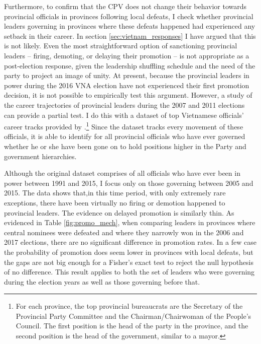 \documentclass[12pt]{article}
\newcommand{\1}{\mathbbm{1}}
\begin{document}
Furthermore, to confirm that the CPV does not change their behavior towards provincial officials in provinces following local defeats, I check whether provincial leaders governing in provinces where these defeats happened had experienced any setback in their career. In section \ref{sec:vietnam_responses} I have argued that this is not likely. Even the most straightforward option of sanctioning provincial leaders -- firing, demoting, or delaying their promotion -- is not appropriate as a post-election response, given the leadership shuffling schedule and the need of the party to project an image of unity. At present, because the provincial leaders in power during the 2016 VNA election have not experienced their first promotion decision, it is not possible to empirically test this argument. However, a study of the career trajectories of provincial leaders during the 2007 and 2011 elections can provide a partial test. I do this with a dataset of top Vietnamese officials' career tracks provided by \cite{MaleskyPhan2017}.\footnote{For each province, the top provincial bureaucrats are the Secretary of the Provincial Party Committee and the Chairman/Chairwoman of the People's Council. The first position is the head of the party in the province, and the second position is the head of the government, similar to a mayor.} Since the dataset tracks every movement of these officials, it is able to identify for all provincial officials who have ever governed whether he or she have been gone on to hold positions higher in the Party and government hierarchies.

Although the original dataset comprises of all officials who have ever been in power between 1991 and 2015, I focus only on those governing between 2005 and 2015. The data shows that,in this time period, with only extremely rare exceptions, there have been virtually no firing or demotion happened to provincial leaders. The evidence on delayed promotion is similarly thin. As evidenced in Table \ref{fig:promo_mech}, when comparing leaders in provinces where central nominees were defeated and where they narrowly won in the 2006 and 2017 elections, there are no significant difference in promotion rates. In a few case the probability of promotion does seem lower in provinces with local defeats, but the gaps are not big enough for a Fisher's exact test to reject the null hypothesis of no difference. This result applies to both the set of leaders who were governing during the election years as well as those governing before that.


\end{document}
